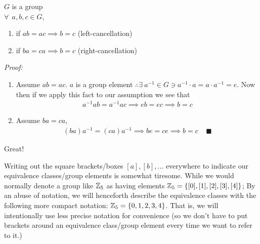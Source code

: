 \begin{lemma}
$G$ is a group\\
$\forall \ \ a,b,c \in G$,
\begin{enumerate}[label=\roman*)]
    \item if $ab=ac \implies b=c$      (left-cancellation)
    \item if $ba=ca \implies b=c$      (right-cancellation)
\end{enumerate}
\textit{Proof:} 
\begin{enumerate}[label=\roman*)]
    \item Assume $ab=ac$. $a$ is a group element $\therefore \exists \ a^{-1}\in G \ni a^{-1}\cdot a = a\cdot a^{-1}=e$. Now then if we apply this fact to our assumption we see that
    \begin{align}
        a^{-1}ab=a^{-1}ac \implies eb=ec \implies b=c\nonumber
    \end{align}
    \item Assume $ba=ca$,
    \begin{align}
        (ba)a^{-1}=(ca)a^{-1} \implies be=ce \implies b=c \ \ \ \ \ \blacksquare \nonumber
    \end{align}
\end{enumerate}
\end{lemma}
Great! 
\begin{notation}
Writing out the square brackets/boxes $[a],[b], ...$ everywhere to indicate our equivalence classes/group elements is somewhat tiresome. While we would normally denote a group like ${\mathbb{ Z}}_5$ as having elements ${\mathbb{ Z}}_5=\{[0],[1],[2],[3],[4]\}$; By an abuse of notation, we will henceforth describe the equivalence classes with the following more compact notation: ${\mathbb{ Z}}_5=\{0,1,2,3,4\}$. That is, we will intentionally use less precise notation for convenience (so we don't have to put brackets around an equivalence class/group element every time we want to refer to it.)
\end{notation}
